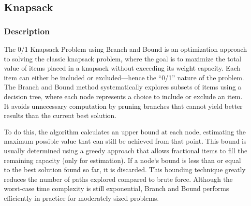 \subsection{Knapsack}
\subsubsection{Description}

The 0/1 Knapsack Problem using Branch and Bound is an optimization approach to solving the classic knapsack problem, where the goal is to maximize the total value of items placed in a knapsack without exceeding its weight capacity. Each item can either be included or excluded—hence the ``0/1'' nature of the problem. The Branch and Bound method systematically explores subsets of items using a decision tree, where each node represents a choice to include or exclude an item. It avoids unnecessary computation by pruning branches that cannot yield better results than the current best solution.

To do this, the algorithm calculates an upper bound at each node, estimating the maximum possible value that can still be achieved from that point. This bound is usually determined using a greedy approach that allows fractional items to fill the remaining capacity (only for estimation). If a node`s bound is less than or equal to the best solution found so far, it is discarded. This bounding technique greatly reduces the number of paths explored compared to brute force. Although the worst-case time complexity is still exponential, Branch and Bound performs efficiently in practice for moderately sized problems.

